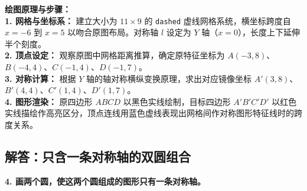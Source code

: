 \vspace{0.4cm}
{\small\color{blue!70!black}
\textbf{绘图原理与步骤：}\\
\textbf{1. 网格与坐标系：} 建立大小为 $11 \times 9$ 的 \texttt{dashed} 虚线网格系统，横坐标跨度自 $x=-6$ 到 $x=5$ 以吻合原图布局。对称轴 $l$ 设定为 $Y$ 轴（$x=0$），长度上下延伸半个刻度。\\
\textbf{2. 顶点设定：} 观察原图中网格距离推算，确定原特征坐标为 $A(-3,8)$、$B(-4,4)、C(-1,4)、D(-1,7)$。\\
\textbf{3. 对称计算：} 根据 $Y$ 轴的轴对称横纵变换原理，求出对应镜像坐标 $A'(3,8)$、$B'(4,4)、C'(1,4)、D'(1,7)$。\\
\textbf{4. 图形渲染：} 原四边形 $ABCD$ 以黑色实线绘制，目标四边形 $A'B'C'D'$ 以红色实线描绘作高亮区分，顶点连线用蓝色虚线表现出网格间作对称图形特征线时的跨度关系。
}

\newpage

\newpage

\subsection{解答：只含一条对称轴的双圆组合}

\vspace{0.4cm}

\noindent\textbf{4. 画两个圆，使这两个圆组成的图形只有一条对称轴。}

\vspace{1.2cm}

\begin{center}
\end{center}

